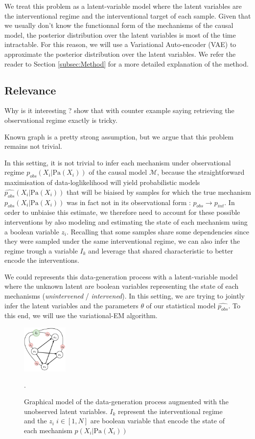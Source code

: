 \documentclass{article}
\begin{document}
We treat this problem as a latent-variable model where the latent variables are the interventional regime and the interventional target of each sample. Given that we usually don't know the functionnal form of the mechanisms of the causal model, the posterior distribution over the latent variables is most of the time intractable. For this reason, we will use a Variational Auto-encoder (VAE) to approximate the posterior distribution over the latent variables. We refer the reader to Section \ref{subsec:Method} for a more detailed explanation of the method.



\subsection{Relevance}
Why is it interesting ? show that with counter example saying retrieving the observational regime exactly is tricky.

Known graph is a pretty strong assumption, but we argue that this problem remains not trivial.

In this setting, it is not trivial to infer each mechanism under observational regime $p_{obs}(X_i | \text{Pa}(X_i))$ of the causal model $\mathcal{M}$, because the straightforward maximisation of data-loglikelihood will yield probabilistic models $\hat{p_{obs}}(X_i | \text{Pa}(X_i))$ that will be biaised by samples for which the true mechanism $p_{obs}(X_i | \text{Pa}(X_i))$ was in fact not in its observational form : $p_{obs} \rightarrow p_{int}$. In order to unbiaise this estimate, we therefore need to account for these possible interventions by also modeling and estimating the state of each mechanism using a boolean variable $z_i$. Recalling that some samples share some dependencies since they were sampled under the same interventional regime, we can also infer the regime trough a variable $I_k$ and  leverage that shared characteristic to better encode the interventions.

We could represents this data-generation process with a latent-variable model where the unknown latent are boolean variables representing the state of each mechanisms (\textit{unintervened} / \textit{intervened}). In this setting, we are trying to jointly infer the latent variables and the parameters $\theta$ of our statistical model $\hat{p_{obs}}$. To this end, we will use the variational-EM algorithm.

\begin{figure}
\centering
    \includegraphics[width=0.2\textwidth]{images/DAG.pdf}
    \caption{Graphical model of the data-generation process augmented with the unobserved latent variables. $I_k$ represent the interventional regime and the $z_i \; i \in [1,N]$ are boolean variable that encode the state of each mechanism $p(X_i | \text{Pa}(X_i))$}.
    \label{fig:DAG}
\end{figure}
\end{document}
